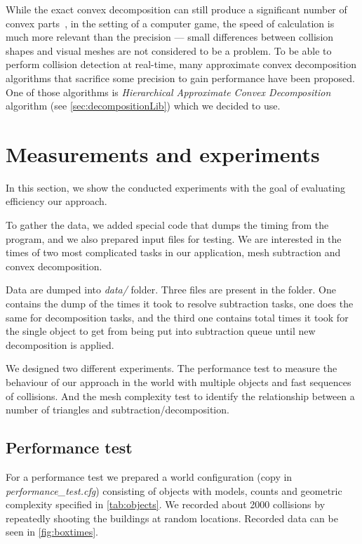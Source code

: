 While the exact convex decomposition can still produce a significant number of convex parts~\cite{convexDecomp}, in the setting of a computer game, the speed of calculation is much more relevant than the precision --- small differences between collision shapes and visual meshes are not considered to be a problem. To be able to perform collision detection at real-time, many approximate convex decomposition algorithms that sacrifice some precision to gain performance have been proposed. One of those algorithms is \emph{Hierarchical Approximate Convex Decomposition} algorithm (see \cref{sec:decompositionLib}) which we decided to use.

\section{Measurements and experiments}
\label{sec:testing}
In this section, we show the conducted experiments with the goal of evaluating efficiency our approach. 

To gather the data, we added special code that dumps the timing from the program, and we also prepared input files for testing. We are interested in the times of two most complicated tasks in our application, mesh subtraction and convex decomposition. 

Data are dumped into \emph{data/} folder. Three files are present in the folder. One contains the dump of the times it took to resolve subtraction tasks, one does the same for decomposition tasks, and the third one contains total times it took for the single object to get from being put into subtraction queue until new decomposition is applied.

We designed two different experiments.  The performance test to measure the behaviour of our approach in the world with multiple objects and fast sequences of collisions. And the mesh complexity test to identify the relationship between a number of triangles and subtraction/decomposition.

\subsection{Performance test}
\label{sec:overallperformance}
For a performance test we prepared a world configuration (copy in \emph{performance\_test.cfg}) consisting of objects with models, counts and geometric complexity specified in \cref{tab:objects}.
We recorded about 2000 collisions by repeatedly shooting the buildings at random locations. Recorded data can be seen in \cref{fig:boxtimes}.

